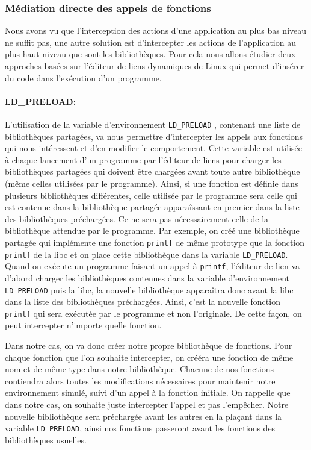 \subsubsection{Médiation directe des appels de fonctions}

Nous avons vu que l'interception des actions d'une application au plus bas
niveau ne suffit pas, une autre solution est d'intercepter les actions de
l'application au plus haut niveau que sont les bibliothèques. Pour cela nous
allons étudier deux approches basées sur l'éditeur de liens dynamiques de Linux
qui permet d'insérer du code dans l'exécution d'un programme.

\paragraph{LD\_PRELOAD:}
\label{paragraphe:LDPreload}

L'utilisation de la variable d'environnement \texttt{LD\_PRELOAD}
\citep{LDPreload}, contenant une liste de bibliothèques partagées, va nous
permettre d'intercepter les appels aux fonctions qui nous intéressent et d'en
modifier le comportement. Cette variable est utilisée à chaque lancement d'un
programme par l'éditeur de liens pour charger les bibliothèques partagées qui
doivent être chargées avant toute autre bibliothèque (même celles utilisées par
le programme). Ainsi, si une fonction est définie dans plusieurs bibliothèques
différentes, celle utilisée par le programme sera celle qui est contenue dans la
bibliothèque partagée apparaîssant en premier dans la liste des bibliothèques
préchargées. Ce ne sera pas nécessairement celle de la bibliothèque
attendue par le programme. Par exemple, on créé une bibliothèque partagée qui
implémente une fonction \texttt{printf} de même prototype que la
fonction \texttt{printf} de la libc et on place cette bibliothèque dans la
variable \texttt{LD\_PRELOAD}. Quand on exécute un programme faisant un appel
à \texttt{printf}, l'éditeur de lien va d'abord charger les bibliothèques
contenues dans la variable d'environnement \texttt{LD\_PRELOAD} puis la libc, la
nouvelle bibliothèque apparaîtra donc avant la libc dans la liste des
bibliothèques préchargées. Ainsi, c'est la nouvelle fonction \texttt{printf}
qui sera exécutée par le programme et non l'originale. De cette façon, on peut
intercepter n'importe quelle fonction.

Dans notre cas, on va donc créer notre propre bibliothèque de fonctions. Pour
chaque fonction que l'on souhaite intercepter, on crééra une
fonction de même nom et de même type dans notre bibliothèque. Chacune de nos
fonctions contiendra alors toutes les modifications nécessaires pour maintenir
notre environnement simulé, suivi d'un appel à la fonction initiale. On rappelle
que dans notre cas, on souhaite juste intercepter l'appel et pas l'empêcher. Notre nouvelle bibliothèque sera préchargée avant les autres en la plaçant dans
la variable \texttt{LD\_PRELOAD}, ainsi nos fonctions passeront avant les
fonctions des bibliothèques usuelles.

